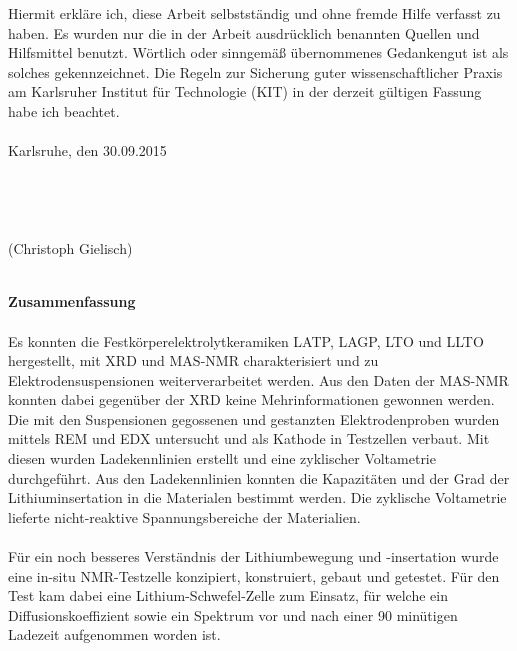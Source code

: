 \documentclass[a4paper, 11pt, headsepline,footsepline,twoside,abstract]{scrbook}
\begin{document}
Hiermit erkläre ich, diese Arbeit selbstständig und ohne fremde Hilfe verfasst zu haben. Es wurden nur die in der Arbeit ausdrücklich benannten Quellen und Hilfsmittel benutzt. Wörtlich oder sinngemäß übernommenes Gedankengut ist als solches gekennzeichnet. Die Regeln zur Sicherung guter wissenschaftlicher Praxis am Karlsruher Institut für Technologie (KIT) in der derzeit gültigen Fassung habe ich beachtet.
\\\\
Karlsruhe, den 30.09.2015
\\\\
\\\\
\\
(Christoph Gielisch) 
 
\newpage

\hspace{20mm} \\
\textbf{\Large{Zusammenfassung}}
\\\\
Es konnten die Festkörperelektrolytkeramiken LATP, LAGP, LTO und LLTO hergestellt, mit XRD und MAS-NMR charakterisiert und zu Elektrodensuspensionen weiterverarbeitet werden. Aus den Daten der MAS-NMR konnten dabei gegenüber der XRD keine Mehrinformationen gewonnen werden. Die mit den Suspensionen gegossenen und gestanzten Elektrodenproben wurden mittels REM und EDX untersucht und als Kathode in Testzellen verbaut. Mit diesen wurden Ladekennlinien erstellt und eine zyklischer Voltametrie durchgeführt. Aus den Ladekennlinien konnten die Kapazitäten und der Grad der Lithiuminsertation in die Materialen bestimmt werden. Die zyklische Voltametrie lieferte nicht-reaktive Spannungsbereiche der Materialien. %
\\\\
Für ein noch besseres Verständnis der Lithiumbewegung und -insertation wurde eine in-situ NMR-Testzelle konzipiert, konstruiert, gebaut und getestet. Für den Test kam dabei eine Lithium-Schwefel-Zelle zum Einsatz, für welche ein Diffusionskoeffizient sowie ein Spektrum vor und nach einer 90 minütigen Ladezeit aufgenommen worden ist.
\end{document}
